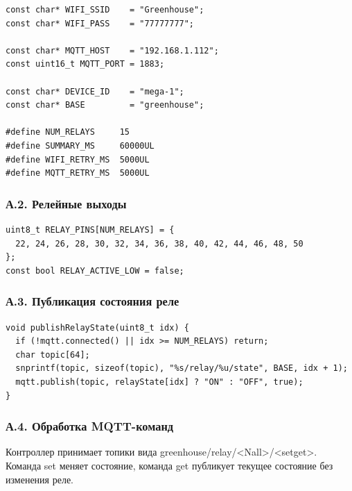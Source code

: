 \documentclass[a4paper,14pt]{extarticle}
\renewcommand{\texttt}[1]{\textnormal{#1}}
\begin{document}
\begin{verbatim}
const char* WIFI_SSID    = "Greenhouse";
const char* WIFI_PASS    = "77777777";

const char* MQTT_HOST    = "192.168.1.112";
const uint16_t MQTT_PORT = 1883;

const char* DEVICE_ID    = "mega-1";
const char* BASE         = "greenhouse";

#define NUM_RELAYS     15
#define SUMMARY_MS     60000UL
#define WIFI_RETRY_MS  5000UL
#define MQTT_RETRY_MS  5000UL
\end{verbatim}

\subsubsection{А.2. Релейные
выходы}\label{ux430.2.-ux440ux435ux43bux435ux439ux43dux44bux435-ux432ux44bux445ux43eux434ux44b}

\begin{verbatim}
uint8_t RELAY_PINS[NUM_RELAYS] = {
  22, 24, 26, 28, 30, 32, 34, 36, 38, 40, 42, 44, 46, 48, 50
};
const bool RELAY_ACTIVE_LOW = false;
\end{verbatim}

\subsubsection{А.3. Публикация состояния
реле}\label{ux430.3.-ux43fux443ux431ux43bux438ux43aux430ux446ux438ux44f-ux441ux43eux441ux442ux43eux44fux43dux438ux44f-ux440ux435ux43bux435}

\begin{verbatim}
void publishRelayState(uint8_t idx) {
  if (!mqtt.connected() || idx >= NUM_RELAYS) return;
  char topic[64];
  snprintf(topic, sizeof(topic), "%s/relay/%u/state", BASE, idx + 1);
  mqtt.publish(topic, relayState[idx] ? "ON" : "OFF", true);
}
\end{verbatim}

\subsubsection{А.4. Обработка
MQTT-команд}\label{ux430.4.-ux43eux431ux440ux430ux431ux43eux442ux43aux430-mqtt-ux43aux43eux43cux430ux43dux434}

Контроллер принимает топики вида
\texttt{greenhouse/relay/\textless{}N\textbar{}all\textgreater{}/\textless{}set\textbar{}get\textgreater{}}.
Команда \texttt{set} меняет состояние, команда \texttt{get} публикует
текущее состояние без изменения реле.
\end{document}
